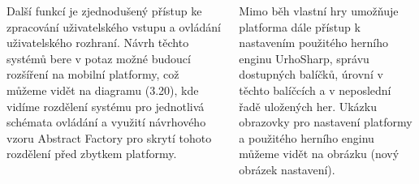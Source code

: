 \documentclass[32pt, a0paper, portrait, margin=2mm, innermargin=10mm, colspace=10mm, subcolspace=8mm, blockverticalspace=10mm]{tikzposter}
\begin{document}
\begin{columns}
{    	Další funkcí je zjednodušený přístup ke zpracování uživatelského vstupu a ovládání uživatelského rozhraní. Návrh těchto systémů bere v potaz možné budoucí rozšíření na mobilní platformy, což můžeme vidět na diagramu (3.20), kde vidíme rozdělení systému pro jednotlivá schémata ovládání a využití návrhového vzoru Abstract Factory pro skrytí tohoto rozdělení před zbytkem platformy.
    }

	 {
		Mimo běh vlastní hry umožňuje platforma dále přístup k nastavením použitého herního enginu UrhoSharp, správu dostupných balíčků, úrovní v těchto balíčcích a v neposlední řadě uložených her. Ukázku obrazovky pro nastavení platformy a použitého herního enginu můžeme vidět na obrázku (nový obrázek nastavení). 
	}
\end{columns}
\end{document}
